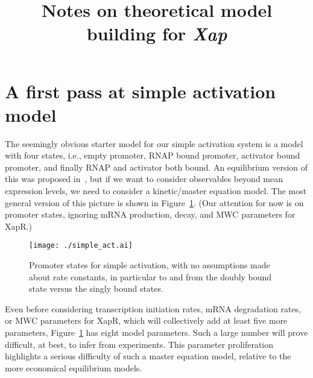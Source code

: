 \documentclass[12pt]{article}%
\newcommand{\fref}[1]{Figure~\ref{#1}}
\begin{document}
\title{Notes on theoretical model building for \textit{Xap}}

\maketitle


\section{A first pass at simple activation model}

The seemingly obvious starter model for our simple activation system is a model with four states, i.e.,
empty promoter, RNAP bound promoter, activator bound promoter, and finally RNAP and activator both bound.
An equilibrium version of this was proposed in~\cite{Bintu2005b},
but if we want to consider observables beyond mean expression levels,
we need to consider a kinetic/master equation model.
The most general version of this picture is shown in \fref{fig:4state}.
(Our attention for now is on promoter states,
ignoring mRNA production, decay, and MWC parameters for XapR.)
\begin{figure}
    \begin{center}
        \texttt{[image: ./simple\_act.ai]}
    \end{center}
    \caption{
            Promoter states for simple activation, with no assumptions made about rate constants,
            in particular to and from the doubly bound state versus the singly bound states.
            }
    \label{fig:4state}
\end{figure}
Even before considering transcription initiation rates, mRNA degradation rates,
or MWC parameters for XapR, which will collectively add at least five more parameters,
\fref{fig:4state} has eight model parameters.
Such a large number will prove difficult, at best, to infer from experiments.
This parameter proliferation highlights a serious difficulty of such a master equation model,
relative to the more economical equilibrium models.
\end{document}
